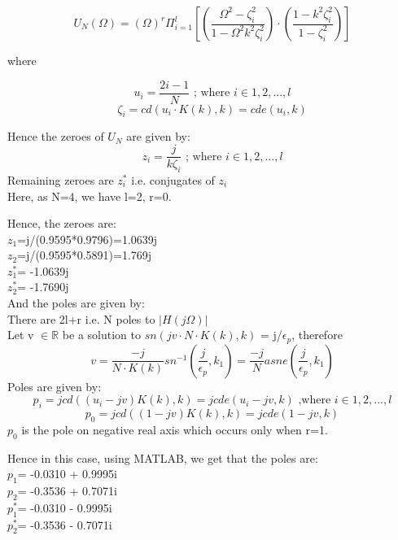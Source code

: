 \documentclass{article}
\begin{document}
\begin{equation}
    U_N(\Omega) = (\Omega)^r\Pi_{i=1}^l\left[\left(\frac{\Omega^2-\zeta_i^2}{1-\Omega^2k^2\zeta_i^2}\right)\cdot\left(\frac{1-k^2\zeta_i^2}{1-\zeta_i^2}\right)\right]
\end{equation}

where

\begin{equation*}
    u_i = \frac{2i-1}{N}\text{ ; where } i \in {1,2,...,l}
\end{equation*}
\begin{equation*}
    \zeta_i = cd(u_i\cdot K(k),k) = \textit{cde}(u_i,k)
\end{equation*}

Hence the zeroes of $U_N$ are given by:
\begin{equation}
    z_i = \frac{j}{k\zeta_i}\text{ ; where } i \in {1,2,...,l}
\end{equation}
Remaining zeroes are $z_i^*$ i.e. conjugates of $z_i$\\
Here, as N=4, we have l=2, r=0.

Hence, the zeroes are:\\
$z_1$=j/(0.9595*0.9796)=1.0639j\\
$z_2$=j/(0.9595*0.5891)=1.769j\\
$z_1^*$= -1.0639j \\
$z_2^*$= -1.7690j\\

And the poles are given by:\\
There are 2l+r i.e. N poles to $|H(j\Omega)|$\\
Let v $\in \mathbb{R}$ be a solution to $sn(jv\cdot N\cdot K(k),k)$ = j/$\epsilon_p$, therefore
\begin{equation}
    v = \frac{-j}{N\cdot K(k)}sn^{-1}(\frac{j}{\epsilon_p},k_1) = \frac{-j}{N}asne(\frac{j}{\epsilon_p},k_1)
\end{equation}
Poles are given by:
\begin{equation}
    p_i = jcd((u_i-jv)K(k),k) = jcde(u_i-jv,k)\text{ ,where } i\in {1,2,...,l}
\end{equation}
\begin{equation}
    p_0 = jcd((1-jv)K(k),k) = jcde(1-jv,k)
\end{equation}
$p_0$ is the pole on negative real axis which occurs only when r=1.

Hence in this case, using MATLAB, we get that the poles are:\\
$p_1$= -0.0310 + 0.9995i\\
$p_2$= -0.3536 + 0.7071i\\
$p_1^*$= -0.0310 - 0.9995i \\
$p_2^*$= -0.3536 - 0.7071i\\
\end{document}
